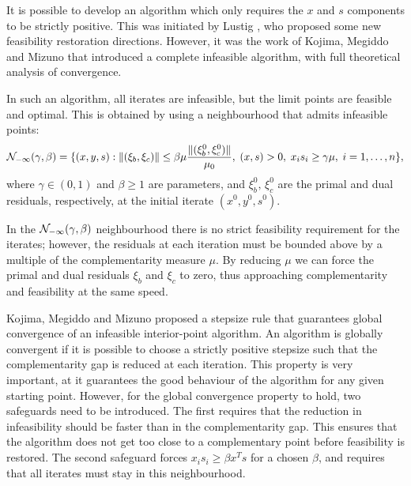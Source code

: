 It is possible to develop an algorithm which only requires 
the $x$ and $s$ components to be strictly positive. 
This was initiated by Lustig \cite{Lustig91}, who proposed some
new feasibility restoration directions.
However, it was the work of Kojima, Megiddo and Mizuno 
\cite{KojimaMegiddoMizuno}
that introduced a complete infeasible algorithm, with full
theoretical analysis of convergence.


In such 
an algorithm, all iterates are infeasible, but the limit points 
are feasible and optimal. This is obtained by using a 
neighbourhood that admits infeasible points:
\[
\mathcal{N}_{-\infty}(\gamma,\beta) =\{ (x,y,s) :
           \|(\xi_b,\xi_c)\| \le \beta\mu \frac{\|(\xi_b^0,\xi_c^0)\|}{\mu_0}, 
	   \; (x,s)>0, \; x_is_i \ge \gamma\mu, \; i = 1, \ldots, n \},
\]
where $\gamma\in (0,1)$ and $\beta \ge 1$ are parameters, and 
$\xi_b^0,\,\xi_c^0$ are the primal and dual residuals, respectively, 
at the initial iterate $(x^0,y^0,s^0)$.

In the $\mathcal{N}_{-\infty}(\gamma,\beta)$ neighbourhood
there is no strict feasibility requirement for 
the iterates; however, the residuals at each iteration must be 
bounded above by a multiple of the complementarity measure $\mu$. 
By reducing $\mu$ we can force the primal and dual residuals 
$\xi_b$ and $\xi_c$ to zero, thus approaching complementarity and 
feasibility at the same speed.

Kojima, Megiddo and Mizuno \cite{KojimaMegiddoMizuno} proposed 
a stepsize rule that guarantees global convergence of an 
infeasible interior-point algorithm.
An algorithm is globally convergent if it is possible to choose
a strictly positive stepsize such that the complementarity gap
is reduced at each iteration. This property is very important, at it
guarantees the good behaviour of the algorithm for any given starting
point. 
However, for the global convergence property to hold, two 
safeguards need to be introduced.
The first requires that the reduction in infeasibility should be faster 
than in the complementarity gap. This ensures that the algorithm
does not get too close to a complementary point before feasibility
is restored.
The second safeguard forces $x_i s_i \ge \beta x^Ts$ for a chosen 
$\beta$, and requires that all iterates must stay in this neighbourhood.

